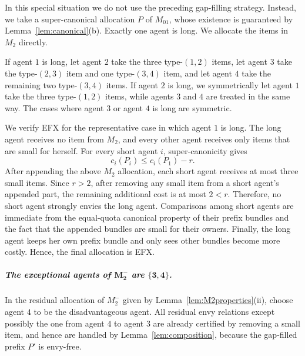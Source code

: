 \documentclass{article}
\theoremstyle{definition}
\begin{document}
In this special situation we do not use the preceding gap-filling strategy.
Instead, we take a super-canonical allocation $P$ of $M_{01}$, whose existence is
guaranteed by Lemma~\ref{lem:canonical}(b).  Exactly one agent is long.  We
allocate the items in $M_2$ directly.

If agent $1$ is long, let agent $2$ take the three type-$(1,2)$ items, let
agent $3$ take the type-$(2,3)$ item and one type-$(3,4)$ item, and let agent
$4$ take the remaining two type-$(3,4)$ items.  If agent $2$ is long, we
symmetrically let agent $1$ take the three type-$(1,2)$ items, while agents
$3$ and $4$ are treated in the same way.  The cases where agent $3$ or agent
$4$ is long are symmetric.

We verify EFX for the representative case in which agent $1$ is long.  The
long agent receives no item from $M_2$, and every other agent receives only
items that are small for herself.  For every short agent $i$, super-canonicity
gives
\[
    c_i(P_i)\le c_i(P_1)-r.
\]
After appending the above $M_2$ allocation, each short agent receives at most
three small items.  Since $r>2$, after removing any small item from a short
agent's appended part, the remaining additional cost is at most $2<r$.
Therefore, no short agent strongly envies the long agent.  Comparisons among
short agents are immediate from the equal-quota canonical property of their
prefix bundles and the fact that the appended bundles are small for their
owners.  Finally, the long agent keeps her own prefix bundle and only sees other bundles become more costly.  Hence, the final allocation is EFX.

\subparagraph{The exceptional agents of $\boldsymbol{M_2^-}$ are $\boldsymbol{\{3,4\}}$.}  In the residual
allocation of $M_2^-$ given by Lemma~\ref{lem:M2properties}(ii), choose agent
$4$ to be the disadvantageous agent.  All residual envy relations except
possibly the one from agent $4$ to agent $3$ are already certified by removing
a small item, and hence are handled by Lemma~\ref{lem:composition}, because
the gap-filled prefix $P'$ is envy-free.
\end{document}
